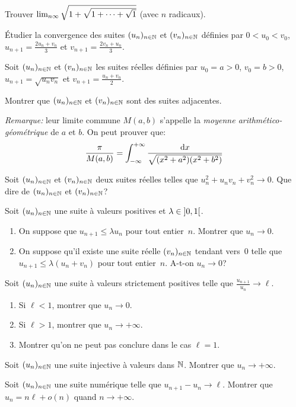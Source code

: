 \documentclass{yann}
\newcommand\U{(u_n)_{n\in\N}}
\newcommand\V{(v_n)_{n\in\N}}
\begin{document}
\Exercice

Trouver $\lim_{n\infty}\sqrt{1+\sqrt{1+ \cdots +\sqrt{1}}}$ (avec $n$ radicaux).

\Exercice

Étudier la convergence des suites $\U$ et $\V$ définies par
$0 < u_0 < v_0$,
$u_{n+1} = \frac{2u_n+v_n}{3}$ et
$v_{n+1} = \frac{2v_n+u_n}{3}$.

\Exercice

Soit $\U$ et $\V$ les suites réelles définies par
$u_0 = a > 0$,
$v_0 = b > 0$,
$u_{n+1} =\sqrt{u_n v_n}$ et
$v_{n+1} = \frac{u_n+v_n}{2}$.

Montrer que $\U$ et $\V$ sont des suites adjacentes.

\emph{Remarque:}
leur limite commune $M(a,b)$ s'appelle la \emph{moyenne arithmético-géométrique} de $a$ et $b$.
On peut prouver que:
\[ \frac{\pi}{M(a,b)} =\int_{-\infty}^{+\infty} \frac{\mathop{}\!\mathrm{d} x}{\sqrt{(x^2+a^2)(x^2+b^2)}} \]

\Exercice

Soit $\U$ et $\V$ deux suites réelles telles que $u_n^2 + u_n v_n + v_n^2 \to 0$.
Que dire de $\U$ et $\V$?

\Exercice

Soit $\U$ une suite à valeurs positives et $\lambda \in \mathopen]0,1\mathclose[$.
\begin{enumerate}
  \item
On suppose que $u_{n+1} \leq \lambda u_n$ pour tout entier~$n$.
  Montrer que $u_n \to 0$.
  \item
On suppose qu'il existe une suite réelle $\V$ tendant vers~0 telle que $u_{n+1} \leq \lambda (u_n + v_n)$ pour tout entier~$n$.
  A-t-on $u_n \to 0$?
\end{enumerate}

\Exercice

Soit $\U$ une suite à valeurs strictement positives
telle que $\frac{u_{n+1}}{u_n} \to \ell$.
\begin{enumerate}
  \item
Si $\ell < 1$, montrer que $u_n \to 0$.
  \item
Si $\ell > 1$, montrer que $u_n \to +\infty$.
  \item
Montrer qu'on ne peut pas conclure dans le cas $\ell = 1$.
\end{enumerate}

\Exercice

Soit $\U$ une suite injective à valeurs dans $\mathbb{N}$.
Montrer que $u_n \to +\infty$.


Soit $\U$ une suite numérique telle que $u_{n+1} - u_n \to \ell$.
Montrer que $u_n = n \ell + o(n)$ quand $n \to +\infty$.
\end{document}
